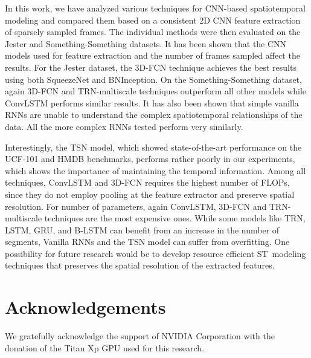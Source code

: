 \documentclass[runningheads]{llncs}
\begin{document}
In this work, we have analyzed various techniques for CNN-based spatiotemporal modeling and compared them based on a consistent 2D CNN feature extraction of sparsely sampled frames. The individual methods were then evaluated on the Jester and Something-Something datasets. It has been shown that the CNN models used for feature extraction and the number of frames sampled affect the results. For the Jester dataset, the 3D-FCN technique achieves the best results using both SqueezeNet and BNInception. On the Something-Something dataset, again 3D-FCN and TRN-multiscale techniques outperform all other models while ConvLSTM performs similar results. It has also been shown that simple vanilla RNNs are unable to understand the complex spatiotemporal relationships of the data. All the more complex RNNs tested perform very similarly.

Interestingly, the TSN model, which showed state-of-the-art performance on the UCF-101 and HMDB benchmarks, performs rather poorly in our experiments, which shows the importance of maintaining the temporal information. Among all techniques, ConvLSTM and 3D-FCN requires the highest number of FLOPs, since they do not employ pooling at the feature extractor and preserve spatial resolution. For number of parameters, again ConvLSTM, 3D-FCN and TRN-multiscale techniques are the most expensive ones. While some models like TRN, LSTM, GRU, and B-LSTM can benefit from an increase in the number of segments, Vanilla RNNs and the TSN model can suffer from overfitting. One possibility for future research would be to develop resource efficient ST~modeling techniques that preserves the spatial resolution of the extracted features. \section*{Acknowledgements}
We gratefully acknowledge the support of NVIDIA Corporation with the donation of the Titan Xp GPU used for this research.
 



\end{document}
